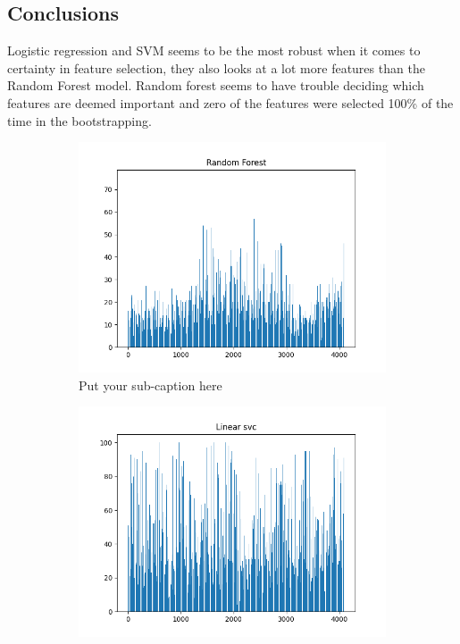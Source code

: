 \documentclass{article}
\begin{document}
\subsection{Conclusions}
Logistic regression and SVM seems to be the most robust when it comes to certainty in feature selection, they also looks at a lot more features than the Random Forest model. Random forest seems to have trouble deciding which features are deemed important and zero of the features were selected 100\% of the time in the bootstrapping. 
\begin{figure}[ht]
\begin{subfigure}{.33\textwidth}
  \centering
  \includegraphics[width=1\linewidth]{1b/Figure_2_bra.png}  
  \caption{Put your sub-caption here}
  \label{RandForSel}
\end{subfigure}
\begin{subfigure}{.33\textwidth}
  \centering
  \includegraphics[width=1\linewidth]{1b/Figure_3_bra.png}  

\end{subfigure}
\end{figure}
\end{document}
